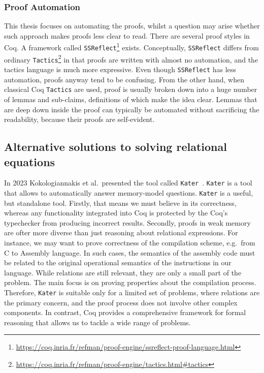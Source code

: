 \subsubsection{Proof Automation}
This thesis focuses on automating the proofs, whilst a question may arise whether such approach makes proofs less clear to read. There are several proof styles in Coq. A framework called \texttt{SSReflect}\footnote{\href{https://coq.inria.fr/refman/proof-engine/ssreflect-proof-language.html}{https://coq.inria.fr/refman/proof-engine/ssreflect-proof-language.html}} exists. Conceptually, \texttt{SSReflect} differs from ordinary \texttt{Tactics}\footnote{\href{https://coq.inria.fr/refman/proof-engine/tactics.html\#tactics}{https://coq.inria.fr/refman/proof-engine/tactics.html\#tactics}} in that proofs are written with almost no automation, and the tactics language is much more expressive. Even though \texttt{SSReflect} has less automation, proofs anyway tend to be confusing. From the other hand, when classical Coq \texttt{Tactics} are used, proof is usually broken down into a huge number of lemmas and sub-claims, definitions of which make the idea clear. Lemmas that are deep down inside the proof can typically be automated without sacrificing the readability, because their proofs are self-evident. 

\subsection{Alternative solutions to solving relational equations}\label{othersoulutions}
In 2023 Kokologiannakis et al.\ presented the tool called \texttt{Kater}~\cite{kater}. \texttt{Kater} is a tool that allows to automatically answer memory-model questions. \texttt{Kater} is a useful, but standalone tool. Firstly, that means we must believe in its correctness, whereas any functionality integrated into Coq is protected by the Coq's typechecker from producing incorrect results. Secondly, proofs in weak memory are ofter more diverse than just reasoning about relational expressions. For instance, we may want to prove correctness of the compilation scheme, e.g.\ from C to Assembly language. In such cases, the semantics of the assembly code must be related to the original operational semantics of the instructions in our language. While relations are still relevant, they are only a small part of the problem. The main focus is on proving properties about the compilation process. Therefore, \texttt{Kater} is suitable only for a limited set of problems, where relations are the primary concern, and the proof process does not involve other complex components. In contrast, Coq provides a comprehensive framework for formal reasoning that allows us to tackle a wide range of problems. 

